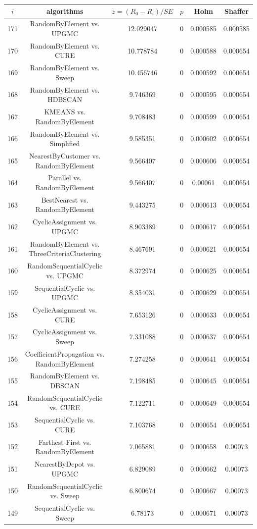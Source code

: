 \documentclass[a4paper,10pt]{article}
\begin{document}
\begin{landscape}
\begin{table}[!htp]
\centering\scriptsize
\begin{tabular}{cccccc}
$i$&algorithms&$z=(R_0 - R_i)/SE$&$p$&Holm&Shaffer\\
\hline171&RandomByElement vs. UPGMC&12.029047&0&0.000585&0.000585\\
170&RandomByElement vs. CURE&10.778784&0&0.000588&0.000654\\
169&RandomByElement vs. Sweep&10.456746&0&0.000592&0.000654\\
168&RandomByElement vs. HDBSCAN&9.746369&0&0.000595&0.000654\\
167&KMEANS vs. RandomByElement&9.708483&0&0.000599&0.000654\\
166&RandomByElement vs. Simplified&9.585351&0&0.000602&0.000654\\
165&NearestByCustomer vs. RandomByElement&9.566407&0&0.000606&0.000654\\
164&Parallel vs. RandomByElement&9.566407&0&0.00061&0.000654\\
163&BestNearest vs. RandomByElement&9.443275&0&0.000613&0.000654\\
162&CyclicAssignment vs. UPGMC&8.903389&0&0.000617&0.000654\\
161&RandomByElement vs. ThreeCriteriaClustering&8.467691&0&0.000621&0.000654\\
160&RandomSequentialCyclic vs. UPGMC&8.372974&0&0.000625&0.000654\\
159&SequentialCyclic vs. UPGMC&8.354031&0&0.000629&0.000654\\
158&CyclicAssignment vs. CURE&7.653126&0&0.000633&0.000654\\
157&CyclicAssignment vs. Sweep&7.331088&0&0.000637&0.000654\\
156&CoefficientPropagation vs. RandomByElement&7.274258&0&0.000641&0.000654\\
155&RandomByElement vs. DBSCAN&7.198485&0&0.000645&0.000654\\
154&RandomSequentialCyclic vs. CURE&7.122711&0&0.000649&0.000654\\
153&SequentialCyclic vs. CURE&7.103768&0&0.000654&0.000654\\
152&Farthest-First vs. RandomByElement&7.065881&0&0.000658&0.00073\\
151&NearestByDepot vs. UPGMC&6.829089&0&0.000662&0.00073\\
150&RandomSequentialCyclic vs. Sweep&6.800674&0&0.000667&0.00073\\
149&SequentialCyclic vs. Sweep&6.78173&0&0.000671&0.00073\\

\end{tabular}
\end{table}
\end{landscape}
\end{document}
